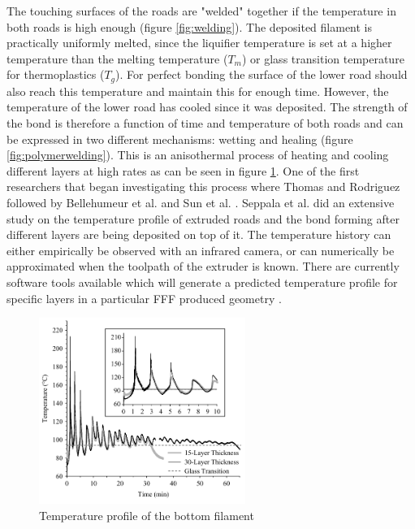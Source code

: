 The touching surfaces of the roads are "welded" together if the temperature in both roads is high enough (figure \ref{fig:welding}). The deposited filament is practically uniformly melted, since the liquifier temperature is set at a higher temperature than the melting temperature ($T_m$) or glass transition temperature for thermoplastics ($T_g$). For perfect bonding the surface of the lower road should also reach this temperature and maintain this for enough time. However, the temperature of the lower road has cooled since it was deposited. The strength of the bond is therefore a function of time and temperature of both roads and can be expressed in two different mechanisms: wetting and healing (figure \ref{fig:polymerwelding}). This is an anisothermal process of heating and cooling different layers at high rates as can be seen in figure \ref{fig:temperaturehistory}. One of the first researchers that began investigating this process where Thomas and Rodriguez \cite{Thomas2000ModelingRoads} followed by Bellehumeur et al. \cite{Bellehumeur2004ModelingProcess} and  Sun et al. \cite{Sun2008}. Seppala et al. \cite{Seppala2017WeldManufacturing} did an extensive study on the temperature profile of extruded roads and the bond forming after different layers are being deposited on top of it. The temperature history can either empirically be observed with an infrared camera, or can numerically be approximated when the toolpath of the extruder is known. There are currently software tools available which will generate a predicted temperature profile for specific layers in a particular FFF produced geometry \cite{XstreamDigimat_AM}. 

\begin{figure}[htb]
    \centering
    \includegraphics[width=0.60\textwidth]{chapter_2/figures/temperaturehistory.PNG}
    \caption{Temperature profile of the bottom filament \cite{Sun2008}
    \label{fig:temperaturehistory}}
\end{figure}

